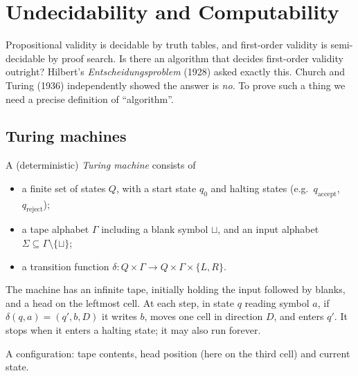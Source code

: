 \chapter{Undecidability and Computability}\label{ch:undecidability}

Propositional validity is decidable by truth tables, and first-order validity is
semi-decidable by proof search. Is there an algorithm that decides first-order validity
outright? Hilbert's \emph{Entscheidungsproblem} (1928) asked exactly this. Church and
Turing (1936) independently showed the answer is \emph{no}. To prove such a thing we need
a precise definition of ``algorithm''.

\section{Turing machines}

\begin{definition}
A (deterministic) \emph{Turing machine} consists of
\begin{itemize}
  \item a finite set of states $Q$, with a start state $q_0$ and halting states
        (e.g.\ $q_{\mathrm{accept}}$, $q_{\mathrm{reject}}$);
  \item a tape alphabet $\Gamma$ including a blank symbol $\sqcup$, and an input alphabet
        $\Sigma\subseteq\Gamma\setminus\{\sqcup\}$;
  \item a transition function
        $\delta: Q\times\Gamma\to Q\times\Gamma\times\{L,R\}$.
\end{itemize}
The machine has an infinite tape, initially holding the input followed by blanks, and a
head on the leftmost cell. At each step, in state $q$ reading symbol $a$, if
$\delta(q,a)=(q',b,D)$ it writes $b$, moves one cell in direction $D$, and enters $q'$. It
stops when it enters a halting state; it may also run forever.
\end{definition}

\begin{center}

\small A configuration: tape contents, head position (here on the third cell) and current state.
\end{center}

